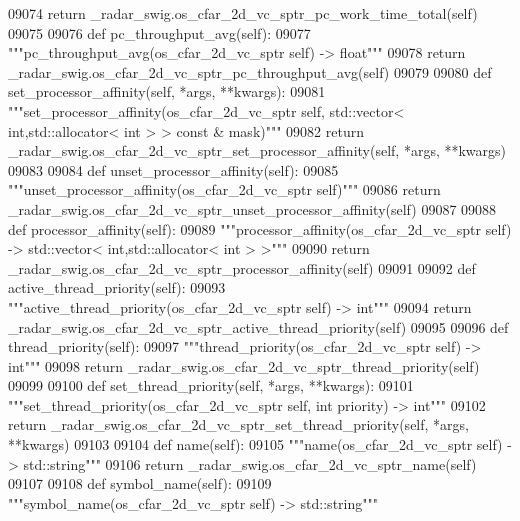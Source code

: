 \begin{DoxyCode}
{{{{{{{{{{{{{{{{{{{{{{{{{{{{{09074         \textcolor{keywordflow}{return} \_radar\_swig.os\_cfar\_2d\_vc\_sptr\_pc\_work\_time\_total(self)
09075 
09076     \textcolor{keyword}{def }pc_throughput_avg(self):
09077         \textcolor{stringliteral}{"""pc\_throughput\_avg(os\_cfar\_2d\_vc\_sptr self) -> float"""}
09078         \textcolor{keywordflow}{return} \_radar\_swig.os\_cfar\_2d\_vc\_sptr\_pc\_throughput\_avg(self)
09079 
09080     \textcolor{keyword}{def }set_processor_affinity(self, *args, **kwargs):
09081         \textcolor{stringliteral}{"""set\_processor\_affinity(os\_cfar\_2d\_vc\_sptr self, std::vector< int,std::allocator< int > > const &
       mask)"""}
09082         \textcolor{keywordflow}{return} \_radar\_swig.os\_cfar\_2d\_vc\_sptr\_set\_processor\_affinity(self, *args, **kwargs)
09083 
09084     \textcolor{keyword}{def }unset_processor_affinity(self):
09085         \textcolor{stringliteral}{"""unset\_processor\_affinity(os\_cfar\_2d\_vc\_sptr self)"""}
09086         \textcolor{keywordflow}{return} \_radar\_swig.os\_cfar\_2d\_vc\_sptr\_unset\_processor\_affinity(self)
09087 
09088     \textcolor{keyword}{def }processor_affinity(self):
09089         \textcolor{stringliteral}{"""processor\_affinity(os\_cfar\_2d\_vc\_sptr self) -> std::vector< int,std::allocator< int > >"""}
09090         \textcolor{keywordflow}{return} \_radar\_swig.os\_cfar\_2d\_vc\_sptr\_processor\_affinity(self)
09091 
09092     \textcolor{keyword}{def }active_thread_priority(self):
09093         \textcolor{stringliteral}{"""active\_thread\_priority(os\_cfar\_2d\_vc\_sptr self) -> int"""}
09094         \textcolor{keywordflow}{return} \_radar\_swig.os\_cfar\_2d\_vc\_sptr\_active\_thread\_priority(self)
09095 
09096     \textcolor{keyword}{def }thread_priority(self):
09097         \textcolor{stringliteral}{"""thread\_priority(os\_cfar\_2d\_vc\_sptr self) -> int"""}
09098         \textcolor{keywordflow}{return} \_radar\_swig.os\_cfar\_2d\_vc\_sptr\_thread\_priority(self)
09099 
09100     \textcolor{keyword}{def }set_thread_priority(self, *args, **kwargs):
09101         \textcolor{stringliteral}{"""set\_thread\_priority(os\_cfar\_2d\_vc\_sptr self, int priority) -> int"""}
09102         \textcolor{keywordflow}{return} \_radar\_swig.os\_cfar\_2d\_vc\_sptr\_set\_thread\_priority(self, *args, **kwargs)
09103 
09104     \textcolor{keyword}{def }name(self):
09105         \textcolor{stringliteral}{"""name(os\_cfar\_2d\_vc\_sptr self) -> std::string"""}
09106         \textcolor{keywordflow}{return} \_radar\_swig.os\_cfar\_2d\_vc\_sptr\_name(self)
09107 
09108     \textcolor{keyword}{def }symbol_name(self):
09109         \textcolor{stringliteral}{"""symbol\_name(os\_cfar\_2d\_vc\_sptr self) -> std::string"""}
}}}}}}}}}}}}}}}}}}}}}}}}}}}}}
\end{DoxyCode}
